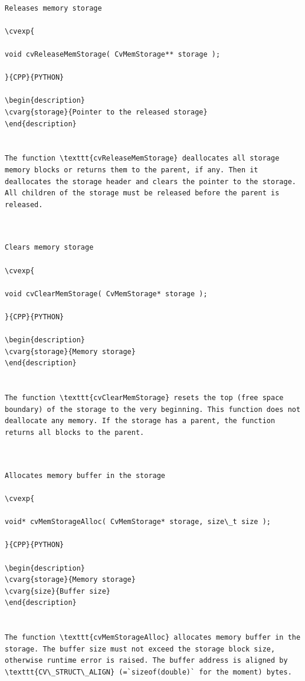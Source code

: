 \begin{verbatim}

Releases memory storage

\cvexp{

void cvReleaseMemStorage( CvMemStorage** storage );

}{CPP}{PYTHON}

\begin{description}
\cvarg{storage}{Pointer to the released storage}
\end{description}


The function \texttt{cvReleaseMemStorage} deallocates all storage memory blocks or returns them to the parent, if any. Then it deallocates the storage header and clears the pointer to the storage. All children of the storage must be released before the parent is released.


\end{verbatim}
\label{ClearMemStorage}
\begin{verbatim}

Clears memory storage

\cvexp{

void cvClearMemStorage( CvMemStorage* storage );

}{CPP}{PYTHON}

\begin{description}
\cvarg{storage}{Memory storage}
\end{description}


The function \texttt{cvClearMemStorage} resets the top (free space boundary) of the storage to the very beginning. This function does not deallocate any memory. If the storage has a parent, the function returns all blocks to the parent.


\end{verbatim}
\label{MemStorageAlloc}
\begin{verbatim}

Allocates memory buffer in the storage

\cvexp{

void* cvMemStorageAlloc( CvMemStorage* storage, size\_t size );

}{CPP}{PYTHON}

\begin{description}
\cvarg{storage}{Memory storage}
\cvarg{size}{Buffer size}
\end{description}


The function \texttt{cvMemStorageAlloc} allocates memory buffer in the storage. The buffer size must not exceed the storage block size, otherwise runtime error is raised. The buffer address is aligned by \texttt{CV\_STRUCT\_ALIGN} (=`sizeof(double)` for the moment) bytes.


\end{verbatim}
